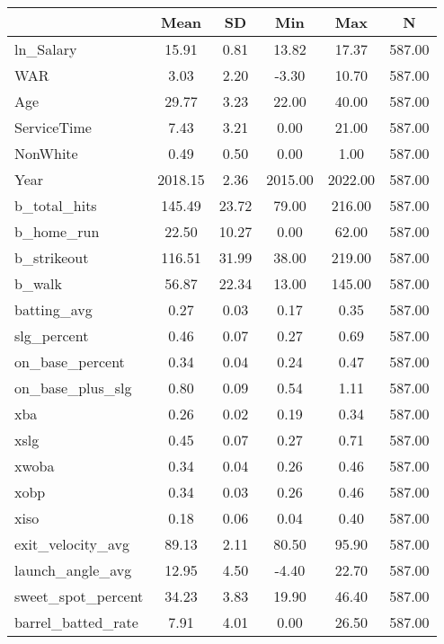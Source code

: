 {
\def\sym#1{\ifmmode^{#1}\else\(^{#1}\)\fi}
\begin{tabular}{l*{1}{ccccc}}
\toprule
                    &        Mean&          SD&         Min&         Max&           N\\
\midrule
ln\_Salary           &       15.91&        0.81&       13.82&       17.37&      587.00\\
WAR                 &        3.03&        2.20&       -3.30&       10.70&      587.00\\
Age                 &       29.77&        3.23&       22.00&       40.00&      587.00\\
ServiceTime         &        7.43&        3.21&        0.00&       21.00&      587.00\\
NonWhite            &        0.49&        0.50&        0.00&        1.00&      587.00\\
Year                &     2018.15&        2.36&     2015.00&     2022.00&      587.00\\
b\_total\_hits        &      145.49&       23.72&       79.00&      216.00&      587.00\\
b\_home\_run          &       22.50&       10.27&        0.00&       62.00&      587.00\\
b\_strikeout         &      116.51&       31.99&       38.00&      219.00&      587.00\\
b\_walk              &       56.87&       22.34&       13.00&      145.00&      587.00\\
batting\_avg         &        0.27&        0.03&        0.17&        0.35&      587.00\\
slg\_percent         &        0.46&        0.07&        0.27&        0.69&      587.00\\
on\_base\_percent     &        0.34&        0.04&        0.24&        0.47&      587.00\\
on\_base\_plus\_slg    &        0.80&        0.09&        0.54&        1.11&      587.00\\
xba                 &        0.26&        0.02&        0.19&        0.34&      587.00\\
xslg                &        0.45&        0.07&        0.27&        0.71&      587.00\\
xwoba               &        0.34&        0.04&        0.26&        0.46&      587.00\\
xobp                &        0.34&        0.03&        0.26&        0.46&      587.00\\
xiso                &        0.18&        0.06&        0.04&        0.40&      587.00\\
exit\_velocity\_avg   &       89.13&        2.11&       80.50&       95.90&      587.00\\
launch\_angle\_avg    &       12.95&        4.50&       -4.40&       22.70&      587.00\\
sweet\_spot\_percent  &       34.23&        3.83&       19.90&       46.40&      587.00\\
barrel\_batted\_rate  &        7.91&        4.01&        0.00&       26.50&      587.00\\
\bottomrule
\end{tabular}
}
